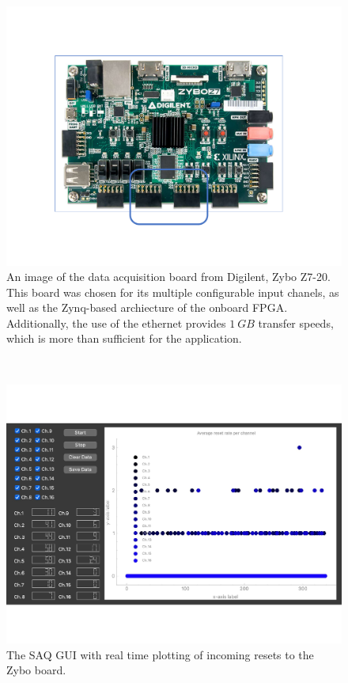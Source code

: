 \begin{figure}[]
\centering
\includegraphics[width=\textwidth]{images/SAQ_zybo_daq.pdf}
\caption{An image of the data acquisition board from Digilent, Zybo Z7-20. This board was chosen for its multiple configurable input chanels, as well as the Zynq-based archiecture of the onboard FPGA. Additionally, the use of the ethernet provides $1~\unit{GB}$ transfer speeds, which is more than sufficient for the application.}
\end{figure}~\label{fig:saq_zybo}

\begin{figure}[]
\centering
\includegraphics[width=\textwidth]{images/SAQ_gui_resets.pdf}
\caption{The SAQ GUI with real time plotting of incoming resets to the Zybo board.}
\end{figure}~\label{fig:saq_gui}


